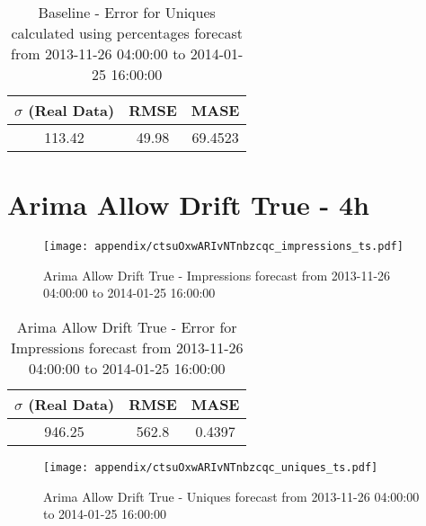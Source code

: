\begin{table}[H]
\centering
\footnotesize
\begin{tabular}{ccc}
$\sigma$ (Real Data) & RMSE & MASE   \\ \hline
113.42 & 49.98 & 69.4523 \\
\end{tabular}

\vspace{0.5cm}

\caption{
Baseline - Error for Uniques calculated using percentages forecast from 2013-11-26 04:00:00 to 2014-01-25 16:00:00}
\end{table}

\section{Arima Allow Drift True - 4h}
\begin{figure}[H] \begin{center} \leavevmode
\texttt{[image: appendix/ctsuOxwARIvNTnbzcqc\_impressions\_ts.pdf]} \caption{
Arima Allow Drift True - Impressions forecast from 2013-11-26 04:00:00 to 2014-01-25 16:00:00} \label{fig:appendix/ctsuOxwARIvNTnbzcqc_impressions_ts.pdf} \end{center}
\end{figure}

\begin{table}[H]
\centering
\footnotesize
\begin{tabular}{ccc}
$\sigma$ (Real Data) & RMSE & MASE   \\ \hline
946.25 & 562.8 & 0.4397 \\
\end{tabular}

\vspace{0.5cm}

\caption{
Arima Allow Drift True - Error for Impressions forecast from 2013-11-26 04:00:00 to 2014-01-25 16:00:00}
\end{table}

\begin{figure}[H] \begin{center} \leavevmode
\texttt{[image: appendix/ctsuOxwARIvNTnbzcqc\_uniques\_ts.pdf]} \caption{
Arima Allow Drift True - Uniques forecast from 2013-11-26 04:00:00 to 2014-01-25 16:00:00} \label{fig:appendix/ctsuOxwARIvNTnbzcqc_uniques_ts.pdf} \end{center}
\end{figure}

